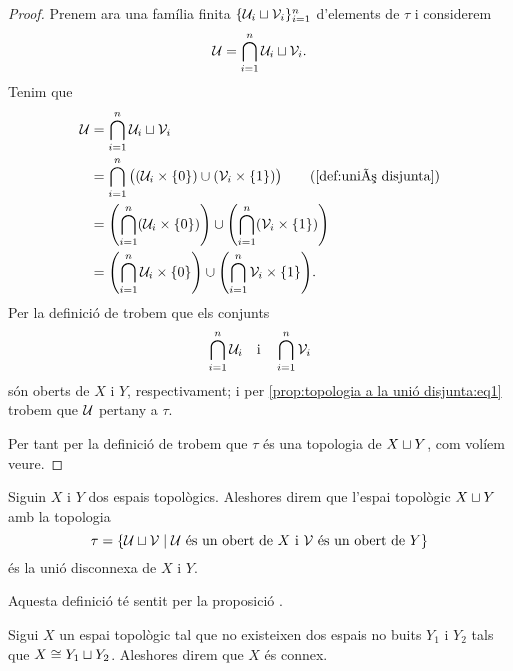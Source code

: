 \documentclass[../../Main.tex]{subfiles}
\begin{document}
\begin{proposition}
\begin{proof}
			Prenem ara una família finita \(\{\mathcal{U}_{i}\mathbin{\sqcup}\mathcal{V}_{i}\}_{i=1}^{n}\) d'elements de \(\tau\) i considerem
			\[
			    \mathcal{U}=\bigcap_{i=1}^{n}\mathcal{U}_{i}\mathbin{\sqcup}\mathcal{V}_{i}.
			\]
			Tenim que
			\begin{align*}
				\obert{U}&=\bigcap_{i=1}^{n}\obert{U}_{i}\uniodisjunta\obert{V}_{i} \\
				&=\bigcap_{i=1}^{n}\big((\obert{U}_{i}\times\{0\})\cup(\obert{V}_{i}\times\{1\})\big) \tag{\ref{def:unió disjunta}} \\
				&=\left(\bigcap_{i=1}^{n}(\obert{U}_{i}\times\{0\})\right)\cup\left(\bigcap_{i=1}^{n}(\obert{V}_{i}\times\{1\})\right) \\
				&=\left(\bigcap_{i=1}^{n}\obert{U}_{i}\times\{0\}\right)\cup\left(\bigcap_{i=1}^{n}\obert{V}_{i}\times\{1\}\right).
			\end{align*}
			Per la definició de  trobem que els conjunts
			\[
			    \bigcap_{i=1}^{n}\mathcal{U}_{i}\quad\text{i}\quad\bigcap_{i=1}^{n}\mathcal{V}_{i}
			\]
			són oberts de \(X\) i \(Y\), respectivament; i per \eqref{prop:topologia a la unió disjunta:eq1} trobem que \(\mathcal{U}\) pertany a \(\tau\).
			
			Per tant per la definició de  trobem que \(\tau\) és una topologia de \(X\mathbin{\sqcup} Y\), com volíem veure.
		\end{proof}
	\end{proposition}
	\begin{definition}
		\label{def:unió disconnexa}
		Siguin \(X\) i \(Y\) dos espais topològics. Aleshores direm que l'espai topològic \(X\mathbin{\sqcup} Y\) amb la topologia
		\[
		    \tau=\{\mathcal{U}\mathbin{\sqcup}\mathcal{V}\mid\mathcal{U}\text{ és un obert de }X\text{ i }\mathcal{V}\text{ és un obert de }Y\}
		\]
		és la unió disconnexa de \(X\) i \(Y\).
		
		Aquesta definició té sentit per la proposició .
	\end{definition}
	\begin{definition}
		\label{def:espai connex}
		Sigui \(X\) un espai topològic tal que no existeixen dos espais no buits \(Y_{1}\) i \(Y_{2}\) tals que \(X\cong Y_{1}\mathbin{\sqcup} Y_{2}\). Aleshores direm que \(X\) és connex.
	\end{definition}
\end{document}

